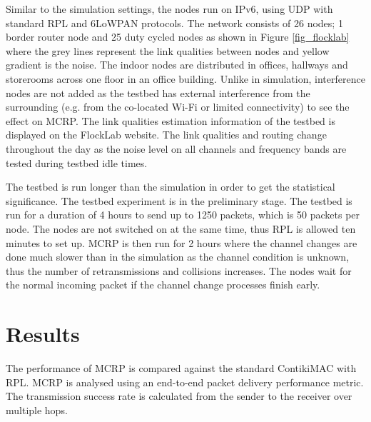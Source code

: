 Similar to the simulation settings, the nodes run on IPv6, using UDP with standard RPL and 6LoWPAN protocols. The network consists of 26 nodes; 1 border router node and 25 duty cycled nodes as shown in Figure \ref{fig_flocklab} where the grey lines represent the link qualities between nodes and yellow gradient is the noise. The indoor nodes are distributed in offices, hallways and storerooms across one floor in an office building. Unlike in simulation, interference nodes are not added as the testbed has external interference from the surrounding (e.g. from the co-located Wi-Fi or limited connectivity) to see the effect on MCRP. The link qualities estimation information of the testbed is displayed on the FlockLab website. The link qualities and routing change throughout the day as the noise level on all channels and frequency bands are tested during testbed idle times.

The testbed is run longer than the simulation in order to get the statistical significance.
The testbed experiment is in the preliminary stage. The testbed is run for a duration of 4 hours to send up to 1250 packets, which is 50 packets per node. The nodes are not switched on at the same time, thus RPL is allowed ten minutes to set up. MCRP is then run for 2 hours where the channel changes are done much slower than in the simulation as the channel condition is unknown, thus the number of retransmissions and collisions increases. The nodes wait for the normal incoming packet if the channel change processes finish early.


\section{Results}
The performance of MCRP is compared against the standard ContikiMAC with RPL. MCRP is analysed using an end-to-end packet delivery performance metric. The transmission success rate is calculated from the sender to the receiver over multiple hops. 

